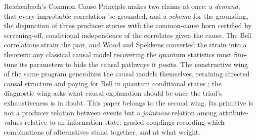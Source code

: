 \documentclass[11pt]{article}
\begin{document}
Reichenbach's Common Cause Principle \cite{reichenbach1956direction} makes two claims at once: a \emph{demand}, that every improbable correlation be grounded, and a \emph{schema} for the grounding, the disjunction of three producer stories with the common-cause horn certified by screening-off, conditional independence of the correlates given the cause. The Bell correlations strain the pair, and Wood and Spekkens \cite{wood_spekkens_2015} converted the strain into a theorem: any classical causal model recovering the quantum statistics must fine-tune its parameters to hide the causal pathways it posits. The constructive wing of the same program generalizes the causal models themselves, retaining directed causal structure and paying for Bell in quantum conditional states \cite{allen2017quantum}; the diagnostic wing asks what causal explanation should be once the triad's exhaustiveness is in doubt. This paper belongs to the second wing. Its primitive is not a producer relation between events but a \emph{jointness} relation among attribute-values relative to an information state: graded couplings recording which combinations of alternatives stand together, and at what weight.
\end{document}

